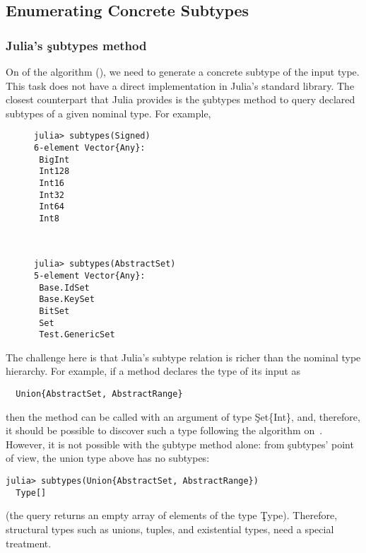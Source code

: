 \subsection{Enumerating Concrete Subtypes}%
\label{sec:approx:enu}

\subsubsection{Julia's \c{subtypes} method}

On  of the algorithm (), we need to generate a
concrete subtype of the input type. This task does not have a direct
implementation in Julia's standard library. The closest counterpart that Julia
provides is the \c{subtypes} method to query declared subtypes of a given
nominal type. For example,
\begin{figure}[h]
\begin{minipage}{.49\textwidth}
\begin{lstlisting}[style=jterm]
julia> subtypes(Signed)
6-element Vector{Any}:
 BigInt
 Int128
 Int16
 Int32
 Int64
 Int8
\end{lstlisting}
\end{minipage}
~
\begin{minipage}{.49\textwidth}
\begin{lstlisting}[style=jterm]
julia> subtypes(AbstractSet)
5-element Vector{Any}:
 Base.IdSet
 Base.KeySet
 BitSet
 Set
 Test.GenericSet

\end{lstlisting}
\end{minipage}
\end{figure}

The challenge here is that Julia's subtype relation is richer than the
nominal type hierarchy. For example, if a method declares the type of its input
as
\begin{lstlisting}
  Union{AbstractSet, AbstractRange}
\end{lstlisting}
then the method can be called with an argument of type \c{Set\{Int\}}, and,
therefore, it should be possible to discover such a type following the algorithm
on~. However, it is not possible with the \c{subtype} method alone:
from \c{subtypes}' point of view, the union type above has no subtypes:
\begin{lstlisting}[style=jterm]
  julia> subtypes(Union{AbstractSet, AbstractRange})
  Type[]
\end{lstlisting}
(the query returns an empty array of elements of the type \c{Type}).
Therefore, structural types %
such as unions,
tuples, and existential types, need a special treatment.

